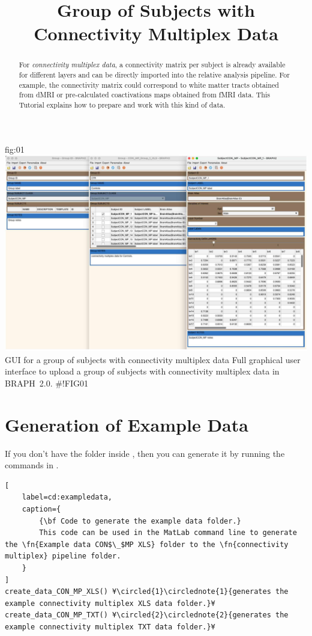 \documentclass[justified]{tufte-handout}
\title{Group of Subjects with Connectivity Multiplex Data}
\begin{document}
\maketitle

\begin{abstract}
\noindent
For \emph{connectivity multiplex data}, a connectivity matrix per subject is already available for different layers and can be directly imported into the relative analysis pipeline. For example, the connectivity matrix could correspond to white matter tracts obtained from dMRI or pre-calculated coactivations maps obtained from fMRI data.
This Tutorial explains how to prepare and work with this kind of data.
\end{abstract}

\tableofcontents

	{fig:01}
	{\includegraphics{fig01.jpg}}
	{GUI for a group of subjects with connectivity multiplex data}
	{
	Full graphical user interface to upload a group of subjects with connectivity multiplex data in BRAPH~2.0. 
	}
#!FIG01

\clearpage
\section{Generation of Example Data}

If you don't have the  folder inside , then you can generate it by running the commands in .

\begin{lstlisting}[
	label=cd:exampledata,
	caption={
		{\bf Code to generate the example data folder.}
		This code can be used in the MatLab command line to generate the \fn{Example data CON$\_$MP XLS} folder to the \fn{connectivity multiplex} pipeline folder.
	}
]
create_data_CON_MP_XLS() ¥\circled{1}\circlednote{1}{generates the example connectivity multiplex XLS data folder.}¥
create_data_CON_MP_TXT() ¥\circled{2}\circlednote{2}{generates the example connectivity multiplex TXT data folder.}¥
\end{lstlisting}
\end{document}
